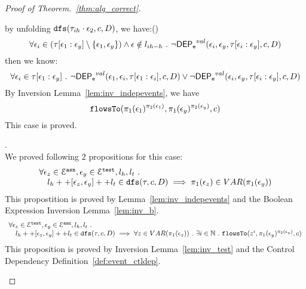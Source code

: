 \begin{proof}[Proof of Theorem.~\ref{thm:alg_correct}]
\begin{case}
\begin{subcase}
\begin{subsubcase}
%
by unfolding $\mathtt{dfs}(\mathtt{\tau}_{ih}\cdot \mathtt{\epsilon}_2, c, D)$, we have:()
\[
  \forall \mathtt{\epsilon}_i \in (\mathtt{\tau}[\mathtt{\epsilon}_1:\mathtt{\epsilon}_y]\setminus \{\mathtt{\epsilon}_1, \mathtt{\epsilon}_y\}) 
 \land \mathtt{\epsilon} \notin l_{ih-h} 
 ~.~ 
 \neg \mathsf{DEP_{\mathtt{e}}}^{val} (\mathtt{\epsilon}_i, \mathtt{\epsilon}_y, \mathtt{\tau}[\mathtt{\epsilon}_i:\mathtt{\epsilon}_y], c, D)
\]
%
%
then we know:
\[
  \forall \mathtt{\epsilon}_i \in \mathtt{\tau}[\mathtt{\epsilon}_1:\mathtt{\epsilon}_y] ~.~
  \neg \mathsf{DEP_{\mathtt{e}}}^{val} (\mathtt{\epsilon}_1, \mathtt{\epsilon}_i, \mathtt{\tau}[\mathtt{\epsilon}_1: \mathtt{\epsilon}_i], c, D) 
  \lor \neg \mathsf{DEP_{\mathtt{e}}}^{val} (\mathtt{\epsilon}_i, \mathtt{\epsilon}_y,\mathtt{\tau}[\mathtt{\epsilon}_i:\mathtt{\epsilon}_y], c, D)
\]
%
By Inversion Lemma~\ref{lem:inv_indepevents}, we have
\[
  \mathtt{flowsTo}(\pi_1(\mathtt{\epsilon}_1)^{\pi_2(\mathtt{\epsilon}_1)}, \pi_1(\mathtt{\epsilon}_y)^{\pi_2(\mathtt{\epsilon}_y)}, c)
\]
%
This case is proved.
%
\end{subsubcase}
%
\end{subcase}
%
%
\begin{subcase}[ $l_e = l_h ++ {[\event_z, \event_b, \event_y]} ++ l_t$ ].
\\
We proved following 2 propositions for this case:
\begin{equation}
  \begin{array}{l}
    \forall \mathtt{\epsilon}_z \in \mathcal{E}^{\mathtt{{asn}}}, \mathtt{\epsilon}_y \in \mathcal{E}^{\mathtt{{test}}}, l_h, l_t ~.~
     \\ \quad 
     l_h ++ [\mathtt{\epsilon}_z, \mathtt{\epsilon}_y] ++ l_t \in \mathtt{dfs}(\mathtt{\tau}, c, D)
    \implies \pi_1(\mathtt{\epsilon}_z) \in VAR(\pi_1(\mathtt{\epsilon}_y))
  \end{array}
  \end{equation}
This propostition is proved by Lemma~\ref{lem:inv_indepevents} and the Boolean Expression Inversion Lemma~\ref{lem:inv_b}.
%
  \begin{equation}
  \begin{array}{l}
    \forall \mathtt{\epsilon}_z \in \mathcal{E}^{\mathtt{{test}}}, \mathtt{\epsilon}_y \in \mathcal{E}^{\mathtt{{asn}}}, l_h, l_t ~.~
     \\ \quad 
     l_h ++ [\mathtt{\epsilon}_z, \mathtt{\epsilon}_y] ++ l_t \in \mathtt{dfs}(\mathtt{\tau}, c, D)
    \implies \forall z \in VAR(\pi_1(\mathtt{\epsilon}_z)) ~.~ \exists i \in\mathbb{N} ~.~
    \mathtt{flowsTo}(z^i, \pi_1(\mathtt{\epsilon}_y)^{\pi_2(\mathtt{\epsilon}_y)}, c)
  \end{array}
  \end{equation}
%
This proposition is proved by Inversion Lemma~\ref{lem:inv_test} and the Control Dependency Definition~\ref{def:event_ctldep}.

\end{subcase}
\end{case}
\end{proof}
